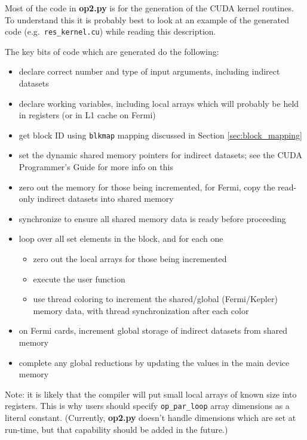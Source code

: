 \documentclass[11pt]{article}
\begin{document}
Most of the code in {\bf op2.py} is for the generation of the CUDA
kernel routines.  To understand this it is probably best to look
at an example of the generated code (e.g.~{\tt res\_kernel.cu})
while reading this description.

The key bits of code which are generated do the following:
\begin{itemize}
\item
declare correct number and type of input arguments, including
indirect datasets

\item
declare working variables, including local arrays which will probably
be held in registers (or in L1 cache on Fermi)

\item
get block ID using {\tt blkmap} mapping discussed in Section
\ref{sec:block_mapping}

\item
set the dynamic shared memory pointers for indirect datasets; see
the CUDA Programmer's Guide for more info on this

\item
zero out the memory for those being incremented, for Fermi,
copy the read-only indirect datasets into shared memory


\item
synchronize to ensure all shared memory data is ready before proceeding

\item
loop over all set elements in the block, and for each one
 \begin{itemize}
 \item zero out the local arrays for those being incremented
 \item execute the user function
 \item use thread coloring to increment the shared/global (Fermi/Kepler) memory data,
       with thread synchronization after each color
 \end{itemize}

\item
on Fermi cards, increment global storage of indirect datasets from shared memory

\item
complete any global reductions by updating the values in the main device
memory

\end{itemize}


Note: it is likely that the compiler will put small local arrays of
known size into registers.  This is why users should specify
{\tt op\_par\_loop} array dimensions as a literal constant.
(Currently, {\bf op2.py} doesn't handle dimensions which are set at
run-time, but that capability should be added in the future.)
\end{document}
